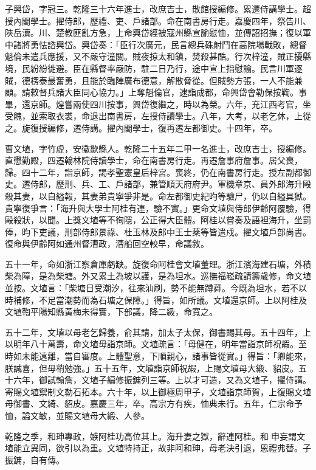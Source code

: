 \begin{pinyinscope}
子興岱，字冠三。乾隆三十六年進士，改庶吉士，散館授編修。累遷侍講學士。超授內閣學士。擢侍郎，歷禮、吏、戶諸部。命在南書房行走。嘉慶四年，祭告川、陜岳瀆。川、楚教匪亂方急，上命興岱經被寇州縣宣諭慰恤，並傳詔招撫；復以軍中諸將勇怯諮興岱。興岱奏：「臣行次廣元，民言總兵硃射鬥在高院場戰敗，總督魁倫未遣兵應援，又不嚴守潼關。賊夜掠太和鎮，焚殺甚酷。行次梓潼，賊正擾縣境，民紛紛徙避。臣在縣督率嚴防，駐二日乃行，途中宣上指慰諭。民言川軍逐賊，德楞泰最奮勇，且能於臨陣廣布德意，解散脅從。但賊勢方張，一人不能兼顧。請敕督兵諸大臣同心協力。」上奪魁倫官，逮詣成都，命興岱會勒保按鞫。事畢，還京師。煌嘗兩使四川按事，興岱復繼之，時以為榮。六年，充江西考官，坐受餽，並索取衣裘，命退出南書房，左授侍讀學士。八年，大考，以老乞休，上從之。旋復授編修，遷侍講。擢內閣學士，復再遷左都御史。十四年，卒。

曹文埴，字竹虛，安徽歙縣人。乾隆二十五年二甲一名進士，改庶吉士，授編修。直懋勤殿，四遷翰林院侍讀學士，命在南書房行走。再遷詹事府詹事。居父喪，歸。四十二年，詣京師，謁孝聖憲皇后梓宮。喪終，仍在南書房行走。授左副都御史。遷侍郎，歷刑、兵、工、戶諸部，兼管順天府府尹。軍機章京、員外郎海升毆殺其妻，以自縊報，其妻弟貴寧爭非是。命左都御史紀昀等驗尸，仍以自縊具獄。貴寧復爭言：「海升與大學士阿桂有連，驗不實。」更命文埴與侍郎伊齡阿覆驗，得毆殺狀，以聞。上獎文埴等不徇隱，公正得大臣體。阿桂以嘗奏及語袒海升，坐罰俸，昀下吏議，刑部侍郎景祿、杜玉林及郎中王士棻等皆遣戍。擢文埴戶部尚書。復命與伊齡阿如通州督漕政，漕船回空較早，命議敘。

五十一年，命如浙江察倉庫虧缺。旋復命阿桂會文埴董理。浙江濱海建石塘，外積柴為障，是為柴塘。外又累土為坡以護，是為坦水。巡撫福崧疏請籌歲修，命文埴並按。文埴言：「柴塘日受潮汐，往來汕刷，勢不能無蹲蕣。今既為坦水，若不以時補修，不足當潮勢而為石塘之保障。」得旨，如所議。文埴還京師。上以阿桂及文埴鞫平陽知縣黃梅未得實，下部議，降二級，命寬之。

五十二年，文埴以母老乞歸養，俞其請，加太子太保，御書賜其母。五十四年，上以明年八十萬壽，命文埴毋詣京師。文埴疏言：「母健在，明年當詣京師祝嘏。至時如未能遠離，當自審度。上體聖意，下順親心，諸事皆從實。」得旨：「卿能來，朕誠喜，但毋稍勉強。」五十五年，文埴詣京師祝嘏，上賜文埴母大緞、貂皮。五十六年，御試翰詹，文埴子編修振鏞列三等。上以才可造，又為文埴子，擢侍講。寄賜文埴禦制文勒石拓本。六十年，以上御極周甲子，文埴詣京師賀，上復賜文埴母御書、文綺、貂皮。嘉慶三年，卒。高宗方有疾，恤典未行。五年，仁宗命予恤，謚文敏，並賜文埴母大緞、人參。

乾隆之季，和珅專政，嫉阿桂功高位其上。海升妻之獄，辭連阿桂。和申妄謂文埴能立異同，欲引以為重。文埴特持正，故非阿和珅，母老決引退，恩禮弗替。子振鏞，自有傳。


\end{pinyinscope}

